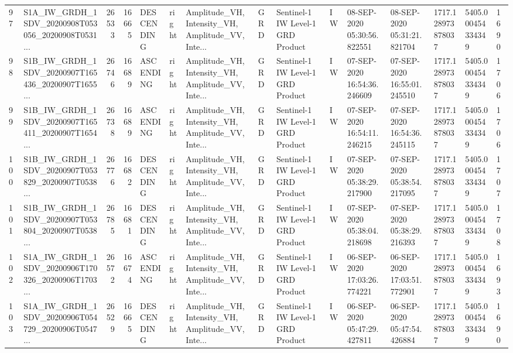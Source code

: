 \begin{tabular}{llrrlllllllllll}
97  &  S1A\_IW\_GRDH\_1SDV\_20200908T053056\_20200908T0531... &  26533 &   16665 &  DESCENDING &  right &  Amplitude\_VH, Intensity\_VH, Amplitude\_VV, Inte... &          GRD &  Sentinel-1 IW Level-1 GRD Product &              IW &  08-SEP-2020 05:30:56.822551 &  08-SEP-2020 05:31:21.821704 &          1717.128973878037 &  5405.000454334349 &       1690 \\
98  &  S1B\_IW\_GRDH\_1SDV\_20200907T165436\_20200907T1655... &  26746 &   16689 &   ASCENDING &  right &  Amplitude\_VH, Intensity\_VH, Amplitude\_VV, Inte... &          GRD &  Sentinel-1 IW Level-1 GRD Product &              IW &  07-SEP-2020 16:54:36.246609 &  07-SEP-2020 16:55:01.245510 &          1717.128973878037 &  5405.000454334349 &       1706 \\
99  &  S1B\_IW\_GRDH\_1SDV\_20200907T165411\_20200907T1654... &  26738 &   16689 &   ASCENDING &  right &  Amplitude\_VH, Intensity\_VH, Amplitude\_VV, Inte... &          GRD &  Sentinel-1 IW Level-1 GRD Product &              IW &  07-SEP-2020 16:54:11.246215 &  07-SEP-2020 16:54:36.245115 &          1717.128973878037 &  5405.000454334349 &       1706 \\
100 &  S1B\_IW\_GRDH\_1SDV\_20200907T053829\_20200907T0538... &  26776 &   16682 &  DESCENDING &  right &  Amplitude\_VH, Intensity\_VH, Amplitude\_VV, Inte... &          GRD &  Sentinel-1 IW Level-1 GRD Product &              IW &  07-SEP-2020 05:38:29.217900 &  07-SEP-2020 05:38:54.217095 &          1717.128973878037 &  5405.000454334349 &       1707 \\
101 &  S1B\_IW\_GRDH\_1SDV\_20200907T053804\_20200907T0538... &  26785 &   16681 &  DESCENDING &  right &  Amplitude\_VH, Intensity\_VH, Amplitude\_VV, Inte... &          GRD &  Sentinel-1 IW Level-1 GRD Product &              IW &  07-SEP-2020 05:38:04.218698 &  07-SEP-2020 05:38:29.216393 &          1717.128973878037 &  5405.000454334349 &       1708 \\
102 &  S1A\_IW\_GRDH\_1SDV\_20200906T170326\_20200906T1703... &  26572 &   16674 &   ASCENDING &  right &  Amplitude\_VH, Intensity\_VH, Amplitude\_VV, Inte... &          GRD &  Sentinel-1 IW Level-1 GRD Product &              IW &  06-SEP-2020 17:03:26.774221 &  06-SEP-2020 17:03:51.772901 &          1717.128973878037 &  5405.000454334349 &       1693 \\
103 &  S1A\_IW\_GRDH\_1SDV\_20200906T054729\_20200906T0547... &  26529 &   16665 &  DESCENDING &  right &  Amplitude\_VH, Intensity\_VH, Amplitude\_VV, Inte... &          GRD &  Sentinel-1 IW Level-1 GRD Product &              IW &  06-SEP-2020 05:47:29.427811 &  06-SEP-2020 05:47:54.426884 &          1717.128973878037 &  5405.000454334349 &       1690 \\

\end{tabular}

